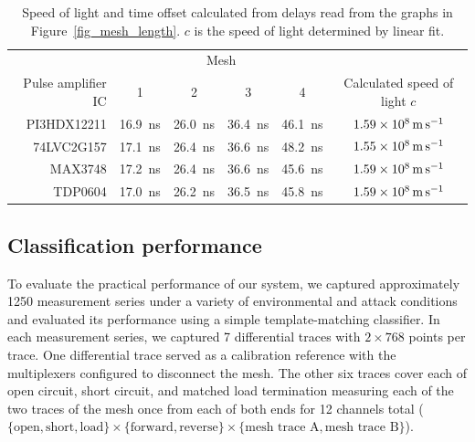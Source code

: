 \documentclass[final]{iacrtrans}
\newcommand{\partno}[1]{\textsf{\small#1}}
\begin{document}
\begin{table}
    \begin{center}
        \begin{tabular}{r|cccc|c}
            &\multicolumn{4}{c|}{Mesh}&\\
            Pulse amplifier IC&
            1&
            2&
            3&
            4&
            Calculated speed of light $c$
            \\\hline

            \partno{PI3HDX12211}&
            \qty{16.9}{\nano\second}&
            \qty{26.0}{\nano\second}&
            \qty{36.4}{\nano\second}&
            \qty{46.1}{\nano\second}&
            $\qty{1.59d8}{\meter\per\second}$\\

            \partno{74LVC2G157}&
            \qty{17.1}{\nano\second}&
            \qty{26.4}{\nano\second}&
            \qty{36.6}{\nano\second}&
            \qty{48.2}{\nano\second}&
            $\qty{1.55d8}{\meter\per\second}$\\

            \partno{MAX3748}&
            \qty{17.2}{\nano\second}&
            \qty{26.4}{\nano\second}&
            \qty{36.6}{\nano\second}&
            \qty{45.6}{\nano\second}&
            $\qty{1.59d8}{\meter\per\second}$\\

            \partno{TDP0604}&
            \qty{17.0}{\nano\second}&
            \qty{26.2}{\nano\second}&
            \qty{36.5}{\nano\second}&
            \qty{45.8}{\nano\second}&
            $\qty{1.59d8}{\meter\per\second}$\\
        \end{tabular}
    \end{center}
    \caption{Speed of light and time offset calculated from delays read from the graphs in Figure\
    \ref{fig_mesh_length}. $c$ is the speed of light determined by linear fit.}
    \label{tab_speed_of_light}
\end{table}

\subsection{Classification performance}
\label{sec-class-perf}

To evaluate the practical performance of our system, we captured approximately 1250 measurement series under a variety
of environmental and attack conditions and evaluated its performance using a simple template-matching classifier. In
each measurement series, we captured 7 differential traces with $2\times768$ points per trace. One differential trace
served as a calibration reference with the multiplexers configured to disconnect the mesh. The other six traces cover
each of open circuit, short circuit, and matched load termination measuring each of the two traces of the mesh once from
each of both ends for 12 channels total ($\{\text{open}, \text{short}, \text{load}\} \times \{\text{forward},
\text{reverse}\} \times \{\text{mesh trace A}, \text{mesh trace B}\}$).
\end{document}
